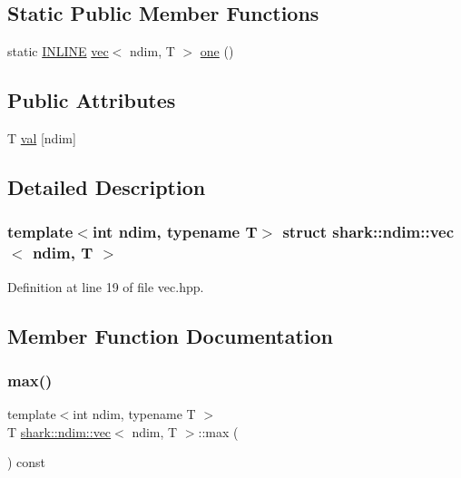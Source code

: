 \subsection*{Static Public Member Functions}
\begin{DoxyCompactItemize}
\item 
static \hyperlink{common_8hpp_a2eb6f9e0395b47b8d5e3eeae4fe0c116}{I\+N\+L\+I\+NE} \hyperlink{structshark_1_1ndim_1_1vec}{vec}$<$ ndim, T $>$ \hyperlink{structshark_1_1ndim_1_1vec_a96c9d1e9b072fbe2cb8ac4f229e25e85}{one} ()
\end{DoxyCompactItemize}
\subsection*{Public Attributes}
\begin{DoxyCompactItemize}
\item 
T \hyperlink{structshark_1_1ndim_1_1vec_a1769eccc65b4b95dced51726c271d077}{val} \mbox{[}ndim\mbox{]}
\end{DoxyCompactItemize}


\subsection{Detailed Description}
\subsubsection*{template$<$int ndim, typename T$>$\newline
struct shark\+::ndim\+::vec$<$ ndim, T $>$}



Definition at line 19 of file vec.\+hpp.



\subsection{Member Function Documentation}
\hypertarget{structshark_1_1ndim_1_1vec_aabdbb224acc832abb50f9a0ab739533a}{}\label{structshark_1_1ndim_1_1vec_aabdbb224acc832abb50f9a0ab739533a} 
\subsubsection{\texorpdfstring{max()}{max()}}
{\footnotesize\ttfamily template$<$int ndim, typename T $>$ \\
T \hyperlink{structshark_1_1ndim_1_1vec}{shark\+::ndim\+::vec}$<$ ndim, T $>$\+::max (\begin{DoxyParamCaption}{ }\end{DoxyParamCaption}) const\hspace{0.3cm}{\ttfamily [inline]}}



